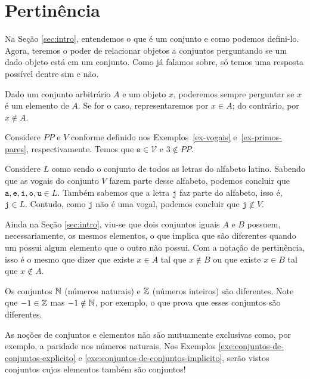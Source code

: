 \section{Pertinência}

Na Seção \ref{sec:intro}, entendemos o que é um conjunto e como podemos defini-lo.
Agora, teremos o poder de relacionar objetos a conjuntos perguntando se um dado objeto está em um conjunto.
Como já falamos sobre, só temos uma resposta possível dentre sim e não.

\begin{definition}
\label{def:in}
Dado um conjunto arbitrário $A$ e um objeto $x$,
poderemos sempre perguntar se $x$ é um elemento de $A$. Se for o caso, representaremos por $x \in A$; do contrário, por $x \notin A$.
\end{definition}

\begin{example}
Considere $PP$ e $V$ conforme definido nos Exemplos~\ref{ex-vogais} e~\ref{ex-primos-pares}, respectivamente. Temos que $\texttt{e} \in \mathcal{V}$ e $3 \notin PP$.
\end{example}

\begin{example}
Considere $L$ como sendo o conjunto de todos as letras do alfabeto latino.
Sabendo que as vogais do conjunto $V$ fazem parte desse alfabeto, podemos concluir que $\texttt{a}, \texttt{e}, \texttt{i}, \texttt{o}, \texttt{u} \in L$.
Também sabemos que a letra $\texttt{j}$ faz parte do alfabeto, isso é, $\texttt{j} \in L$.
Contudo, como $\texttt{j}$ não é uma vogal, podemos concluir que $\texttt{j} \notin V$.
\end{example}

Ainda na Seção \ref{sec:intro}, viu-se que dois conjuntos iguais $A$ e $B$ possuem, necessariamente, os mesmos elementos, o que implica que são diferentes quando um possui algum elemento que o outro não possui.
Com a notação de pertinência, isso é o mesmo que dizer que existe $x \in A$ tal que $x \notin B$ ou que existe $x \in B$ tal que $x \notin A$.

\begin{example}
Os conjuntos $\mathbb{N}$ (números naturais) e $\mathbb{Z}$ (números inteiros) são diferentes. Note que $-1 \in \mathbb{Z}$ mas $-1 \notin \mathbb{N}$, por exemplo, o que prova que esses conjuntos são diferentes.
\end{example}

As noções de conjuntos e elementos não são mutuamente exclusivas como, por exemplo, a paridade nos números naturais. 
Nos Exemplos \ref{exe:conjuntos-de-conjuntos-explicito} e \ref{exe:conjuntos-de-conjuntos-implicito}, serão vistos conjuntos cujos elementos também são conjuntos!


